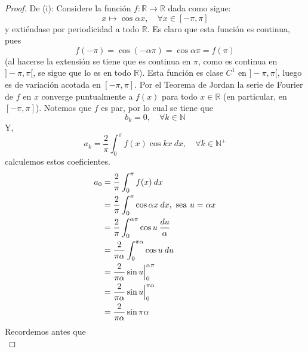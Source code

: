 \documentclass[12pt]{report}
\newcounter{it}
\theoremstyle{largebreak}
\newcommand\cf[3]{\ensuremath{#1:#2\rightarrow#3}}
\begin{document}
    \begin{proof}
        De (i): Considere la función $\cf{f}{\mathbb{R}}{\mathbb{R}}$ dada como sigue:
        \begin{equation*}
            x\mapsto \cos\alpha x,\quad\forall x\in[-\pi,\pi]
        \end{equation*}
        y extiéndase por periodicidad a todo $\mathbb{R}$. Es claro que esta función es continua, pues
        \begin{equation*}
            f(-\pi)=\cos(-\alpha\pi)=\cos\alpha\pi=f(\pi)
        \end{equation*}
        (al hacerse la extensión se tiene que es continua en $\pi$, como es continua en $]-\pi,\pi[$, se sigue que lo es en todo $\mathbb{R}$). Esta función es clase $C^1$ en $]-\pi,\pi[$, luego es de variación acotada en $[-\pi,\pi]$. Por el Teorema de Jordan la serie de Fourier de $f$ en $x$ converge puntualmente a $f(x)$ para todo $x\in\mathbb{R}$ (en particular, en $[-\pi,\pi]$). Notemos que $f$ es par, por lo cual se tiene que
        \begin{equation*}
            b_k=0,\quad\forall k\in\mathbb{N}
        \end{equation*}
        Y,
        \begin{equation*}
            a_k=\frac{2}{\pi}\int_{0}^{\pi}f(x)\cos kx\:dx,\quad\forall k\in\mathbb{N}^+
        \end{equation*}
        calculemos estos coeficientes.
        \begin{equation*}
            \begin{split}
                a_0&=\frac{2}{\pi}\int_{0}^{\pi}f(x)\:dx\\
                &=\frac{2}{\pi}\int_{0}^{\pi}\cos\alpha x\:dx,\textup{  sea }u=\alpha x \\
                &=\frac{2}{\pi}\int_{0}^{\alpha\pi}\cos u\: \frac{du}{\alpha}\\
                &=\frac{2}{\pi\alpha}\int_{0}^{\pi\alpha}\cos u\:du\\
                &=\frac{2}{\pi\alpha}\sin u\Big|_{0}^{\alpha\pi}\\
                &=\frac{2}{\pi\alpha}\sin u\Big|_{0}^{\pi\alpha}\\
                &=\frac{2}{\pi\alpha}\sin\pi\alpha\\
            \end{split}
        \end{equation*}
        Recordemos antes que
        \begin{equation*}

\end{equation*}
\end{proof}
\end{document}
